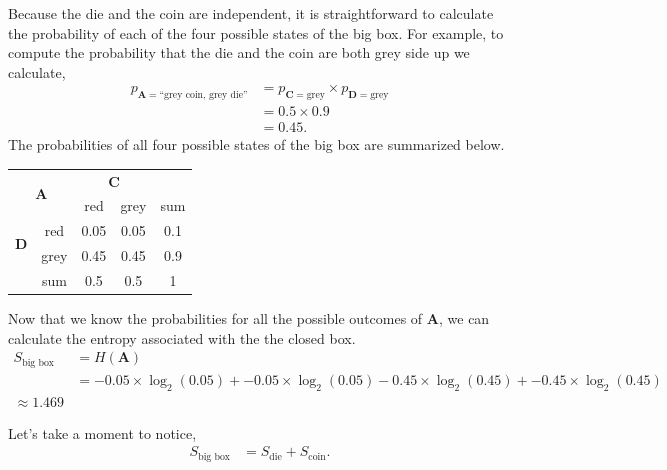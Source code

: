 Because the die and the coin are independent, it is straightforward to calculate the probability of each of the four possible states of the big box.
For example, to compute the probability that the die and the coin are both grey side up we calculate,
\begin{align*}
p_{\bm{A} = \text{``grey coin, grey die''}}
&= p_{\bm{C} = \text{grey}} \times p_{\bm{D} = \text{grey}} \\
&= 0.5 \times 0.9 \\
&= 0.45.
\end{align*}
The probabilities of all four possible states of the big box are summarized below.
\begin{center}
 \begin{tabular}{c c || c | c || c}
 \multicolumn{2}{c}{\multirow{2}{*}{$\bm{A}$}} & \multicolumn{2}{c}{$\bm{C}$} & {}\\
\multicolumn{2}{c}{} & red & grey & sum \\ [0.5ex]
 \hline\hline
\multirow{2}{*}{$\bm{D}$} & red & 0.05 & 0.05 & 0.1 \\
 \cline{2-5}
 & grey & 0.45 & 0.45 & 0.9 \\
 \hline\hline
  {} & sum & 0.5 & 0.5 & 1 \\ [1ex]
\end{tabular}
\end{center}

Now that we know the probabilities for all the possible outcomes of $\bm{A}$, we can calculate the entropy associated with the the closed box.
\begin{align*}
S_{\text{big box}}
&=
H(\bm{A}) \\
&=
- 0.05 \times \log_2(0.05)
+ - 0.05 \times \log_2(0.05)
- 0.45 \times \log_2(0.45)
+ - 0.45 \times \log_2(0.45) \\
\approx 1.469
\end{align*}

Let's take a moment to notice,
\begin{align*}
S_{\text{big box}}
&=
S_{\text{die}} + S_{\text{coin}}.
\end{align*}

